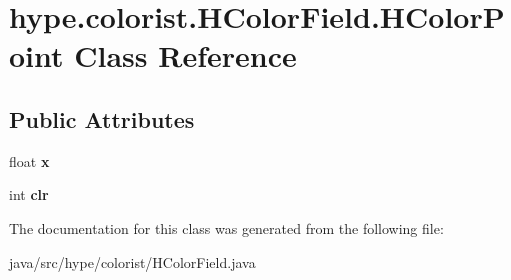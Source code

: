 \hypertarget{classhype_1_1colorist_1_1_h_color_field_1_1_h_color_point}{\section{hype.\-colorist.\-H\-Color\-Field.\-H\-Color\-Point Class Reference}
\label{classhype_1_1colorist_1_1_h_color_field_1_1_h_color_point}
}
\subsection*{Public Attributes}
\begin{DoxyCompactItemize}
\item 
\hypertarget{classhype_1_1colorist_1_1_h_color_field_1_1_h_color_point_a79d3855e2d3072c655c1f6168c9ec751}{float {\bfseries x}}\label{classhype_1_1colorist_1_1_h_color_field_1_1_h_color_point_a79d3855e2d3072c655c1f6168c9ec751}

\item 
\hypertarget{classhype_1_1colorist_1_1_h_color_field_1_1_h_color_point_a977c0aef5169e7cd14baef30415d977d}{int {\bfseries clr}}\label{classhype_1_1colorist_1_1_h_color_field_1_1_h_color_point_a977c0aef5169e7cd14baef30415d977d}

\end{DoxyCompactItemize}


The documentation for this class was generated from the following file\-:\begin{DoxyCompactItemize}
\item 
java/src/hype/colorist/H\-Color\-Field.\-java\end{DoxyCompactItemize}
